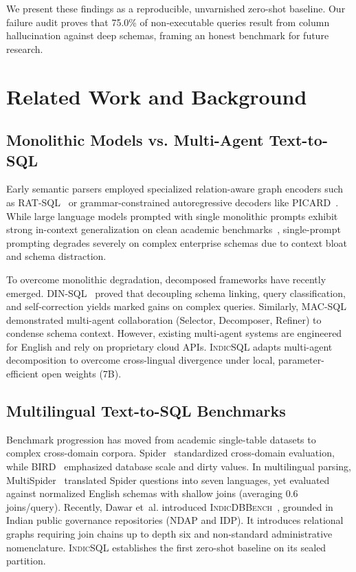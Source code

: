 \documentclass[conference]{IEEEtran}
\begin{document}
We present these findings as a reproducible, unvarnished zero-shot baseline. Our failure audit proves that 75.0\% of non-executable queries result from column hallucination against deep schemas, framing an honest benchmark for future research.

\section{Related Work and Background}\label{sec:related_work}

\subsection{Monolithic Models vs. Multi-Agent Text-to-SQL}
Early semantic parsers employed specialized relation-aware graph encoders such as RAT-SQL~\cite{li2020ratsql} or grammar-constrained autoregressive decoders like PICARD~\cite{scholak2021picard}. While large language models prompted with single monolithic prompts exhibit strong in-context generalization on clean academic benchmarks~\cite{gao2023gpt4}, single-prompt prompting degrades severely on complex enterprise schemas due to context bloat and schema distraction.

To overcome monolithic degradation, decomposed frameworks have recently emerged. DIN-SQL~\cite{pourreza2023dinsql} proved that decoupling schema linking, query classification, and self-correction yields marked gains on complex queries. Similarly, MAC-SQL~\cite{wang2024macsql} demonstrated multi-agent collaboration (Selector, Decomposer, Refiner) to condense schema context. However, existing multi-agent systems are engineered for English and rely on proprietary cloud APIs. \textsc{IndicSQL} adapts multi-agent decomposition to overcome cross-lingual divergence under local, parameter-efficient open weights (7B).

\subsection{Multilingual Text-to-SQL Benchmarks}
Benchmark progression has moved from academic single-table datasets to complex cross-domain corpora. Spider~\cite{yu2018spider} standardized cross-domain evaluation, while BIRD~\cite{li2023bird} emphasized database scale and dirty values. In multilingual parsing, MultiSpider~\cite{dou2022multispider} translated Spider questions into seven languages, yet evaluated against normalized English schemas with shallow joins (averaging 0.6 joins/query). Recently, Dawar et~al. introduced \textsc{IndicDBBench}~\cite{dawar2026indicdbbench}, grounded in Indian public governance repositories (NDAP and IDP). It introduces relational graphs requiring join chains up to depth six and non-standard administrative nomenclature. \textsc{IndicSQL} establishes the first zero-shot baseline on its sealed partition.
\end{document}
